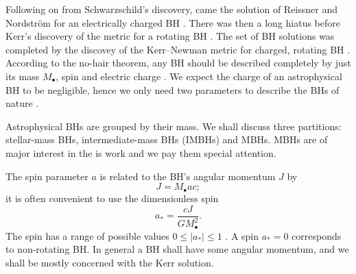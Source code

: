 Following on from Schwarzschild's discovery, came the solution of Reissner and Nordstr{\"o}m for an electrically charged BH \citep{Reissner1916,Nordstrom1918}. There was then a long hiatus before Kerr's discovery of the metric for a rotating BH \citep{Kerr1963}. The set of BH solutions was completed by the discovey of the Kerr--Newman metric for charged, rotating BH \citep{Newman1965}. According to the no-hair theorem, any BH should be described completely by just its mass $M_\bullet$, spin and electric charge \citep{Israel1967, Israel1968, Carter1971, Hawking1972, Robinson1975}. We expect the charge of an astrophysical BH to be negligible, hence we only need two parameters to describe the BHs of nature \citep[sections 36 and 51]{Chandrasekhar1992}.

Astrophysical BHs are grouped by their mass. We shall discuss three partitions: stellar-mass BHs, intermediate-mass BHs (IMBHs) and MBHs. MBHs are of major interest in the is work and we pay them special attention.

The spin parameter $a$ is related to the BH's angular momentum $J$ by
\begin{equation}
J = M_\bullet ac;
\end{equation}
it is often convenient to use the dimensionless spin
\begin{equation}
a_\ast = \frac{cJ}{GM_\bullet^2}.
\end{equation}
The spin has a range of possible values $0 \leq |a_\ast| \leq 1$ \cite[section 66]{Chandrasekhar1992}. A spin $a_\ast = 0$ corresponds to non-rotating BH. In general a BH shall have some angular momentum, and we shall be mostly concerned with the Kerr solution.

